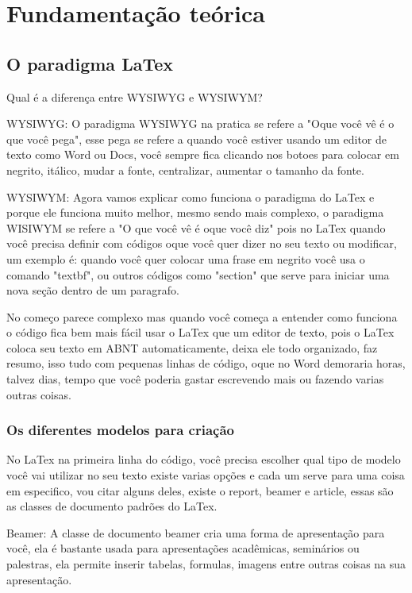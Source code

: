 \chapter{Fundamentação teórica}
\lipsum[1-3]
\section{O paradigma LaTex}
Qual é a diferença entre WYSIWYG e WYSIWYM?


WYSIWYG: O paradigma WYSIWYG na pratica se refere a "Oque você vê é o que você pega", esse pega se refere a quando você estiver usando um editor de texto como Word ou Docs, você sempre fica clicando nos botoes para colocar em negrito, itálico, mudar a fonte, centralizar, aumentar o tamanho da fonte.  

    
WYSIWYM: Agora vamos explicar como funciona o paradigma do LaTex e porque ele funciona muito melhor, mesmo sendo mais complexo, o paradigma WISIWYM se refere a "O que você vê é oque você diz" pois no LaTex quando você precisa definir com códigos oque você quer dizer no seu texto ou modificar, um exemplo é: quando você quer colocar uma frase em negrito você usa o comando "textbf", ou outros códigos como "section" que serve para iniciar uma nova seção dentro de um paragrafo.

    
No começo parece complexo mas quando você começa a entender como funciona o código fica bem mais fácil usar o LaTex que um editor de texto, pois o LaTex coloca seu texto em ABNT automaticamente, deixa ele todo organizado, faz resumo, isso tudo com pequenas linhas de código, oque no Word demoraria horas, talvez dias, tempo que você poderia gastar escrevendo mais ou fazendo varias outras coisas.

\subsection{Os diferentes modelos para criação}
No LaTex na primeira linha do código, você precisa escolher qual tipo de modelo você vai utilizar no seu texto existe varias opções e cada um serve para uma coisa em especifico, vou citar alguns deles, existe o report, beamer e article, essas são as classes de documento padrões do LaTex.

Beamer: A classe de documento beamer cria uma forma de apresentação para você, ela é bastante usada para apresentações acadêmicas, seminários ou palestras, ela permite inserir tabelas, formulas, imagens entre outras coisas na sua apresentação.


